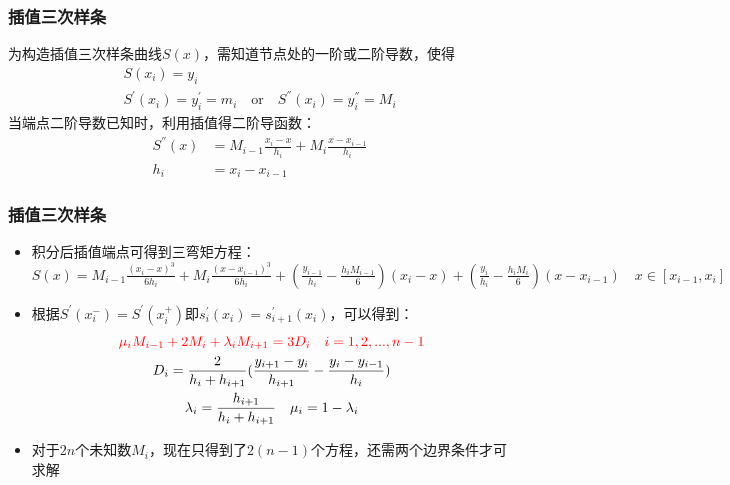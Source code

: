 \documentclass[red,compress]{beamer}
\begin{document}
\begin{frame}
\frametitle{插值三次样条}

为构造插值三次样条曲线$S(x)$，需知道节点处的一阶或二阶导数，使得
\begin{gather*}
	S(x_i)=y_i \\
	S^{'}(x_i)=y_i^{'}=m_i \quad \text{or}\quad S^{''}(x_i)=y_i^{''}=M_i
\end{gather*}
当端点二阶导数已知时，利用插值得二阶导函数：
\begin{align*}
	S^{''}(x)&=M_{i-1}\frac{x_i-x}{h_i}+M_i\frac{x-x_{i-1}}{h_i} \\
	h_i &= x_i-x_{i-1}
\end{align*}
\end{frame}

\begin{frame}
\frametitle{插值三次样条}
\begin{itemize}
\item
积分后插值端点可得到三弯矩方程：
$S(x)=M_{i-1}\frac{(x_i-x)^3}{6h_i}+M_i\frac{(x-x_{i-1})^3}{6h_i}+(\frac{y_{i-1}}{h_i}-\frac{h_iM_{i-1}}{6})(x_i-x)+(\frac{y_{i}}{h_i}-\frac{h_iM_{i}}{6})(x-x_{i-1})\quad x \in [x_{i-1},x_i]$ 

\item
根据$S^{'}(x_{i}^{-})=S^{'}(x_{i}^{+})$即$s^{'}_i(x_{i})=s^{'}_{i+1}(x_{i})$，可以得到：
\begin{gather*}
	\textcolor{red}{\mu_iM_{i-1}+2M_i+\lambda_iM_{i+1}=3D_i \quad i=1,2,...,n-1} \\
	D_i=\frac{2}{h_i+h_{i+1}}(\frac{y_{i+1}-y_i}{h_{i+1}}-\frac{y_{i}-y_{i-1}}{h_{i}}) \\
	\lambda_i=\frac{h_{i+1}}{h_i+h_{i+1}} \quad
	\mu_i=1-\lambda_i
\end{gather*}

\item
对于$2n$个未知数$M_i$，现在只得到了$2(n-1)$个方程，还需两个边界条件才可求解
\end{itemize}
\end{frame}
\end{document}
